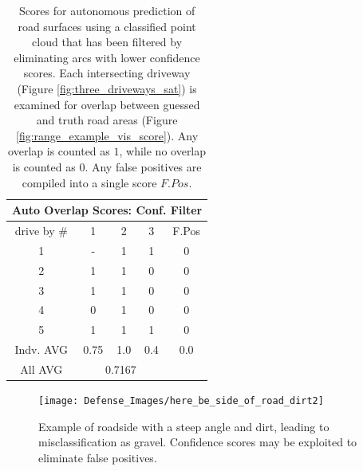\documentclass[numbered,pdftex]{ohio-etd}
\begin{document}
{{		\begin{table}[H]
			\centering
			\begin{tabular}{|llllc|}
				\hline
				\multicolumn{5}{|c|}{Auto Overlap Scores: Conf. Filter}                                                                         \\ \hline
				\multicolumn{1}{|c|}{drive by \#}& \multicolumn{1}{c|}{1} 		& \multicolumn{1}{c|}{2} 	& \multicolumn{1}{c|}{3}   	& F.Pos 	\\ \hline
				\multicolumn{1}{|c|}{1}          & \multicolumn{1}{c|}{-} 		& \multicolumn{1}{c|}{1} 	& \multicolumn{1}{c|}{1}   	& 0     	\\ \hline
				\multicolumn{1}{|c|}{2}          & \multicolumn{1}{c|}{1} 		& \multicolumn{1}{c|}{1} 	& \multicolumn{1}{c|}{0}   	& 0     	\\ \hline
				\multicolumn{1}{|c|}{3}          & \multicolumn{1}{c|}{1} 		& \multicolumn{1}{c|}{1} 	& \multicolumn{1}{c|}{0}   	& 0     	\\ \hline
				\multicolumn{1}{|c|}{4}          & \multicolumn{1}{c|}{0} 		& \multicolumn{1}{c|}{1} 	& \multicolumn{1}{c|}{0}   	& 0     	\\ \hline
				\multicolumn{1}{|c|}{5}          & \multicolumn{1}{c|}{1} 		& \multicolumn{1}{c|}{1} 	& \multicolumn{1}{c|}{1}   	& 0     	\\ \hline
				\multicolumn{1}{|c|}{Indv. AVG}  & \multicolumn{1}{c|}{0.75} 	& \multicolumn{1}{c|}{1.0} 	& \multicolumn{1}{c|}{0.4} 	& 0.0 		\\ \hline
				\multicolumn{1}{|c|}{All AVG}    & \multicolumn{3}{c|}{0.7167}                                                   		&			\\ \hline
			\end{tabular}
			\caption[Overlap Scoring Table - Auto with Classification Filter]{Scores for autonomous prediction of road surfaces using a classified point cloud that has been filtered by eliminating arcs with lower confidence scores. Each intersecting driveway (Figure \ref{fig:three_driveways_sat}) is examined for overlap between guessed and truth road areas (Figure \ref{fig:range_example_vis_score}). Any overlap is counted as $1$, while no overlap is counted as $0$. Any false positives are compiled into a single score $F.Pos$.}
			\label{tab:example_overlap_score_auto_tight}
		\end{table}
		
		\begin{figure}[H]
			\centering
			\texttt{[image: Defense\_Images/here\_be\_side\_of\_road\_dirt2]}
			\caption[Blackburn Road Side of Road]{Example of roadside with a steep angle and dirt, leading to misclassification as gravel. Confidence scores may be exploited to eliminate false positives.}
			\label{fig:here_be_side_of_road_dirt2}
		\end{figure}
		
}}
\end{document}
